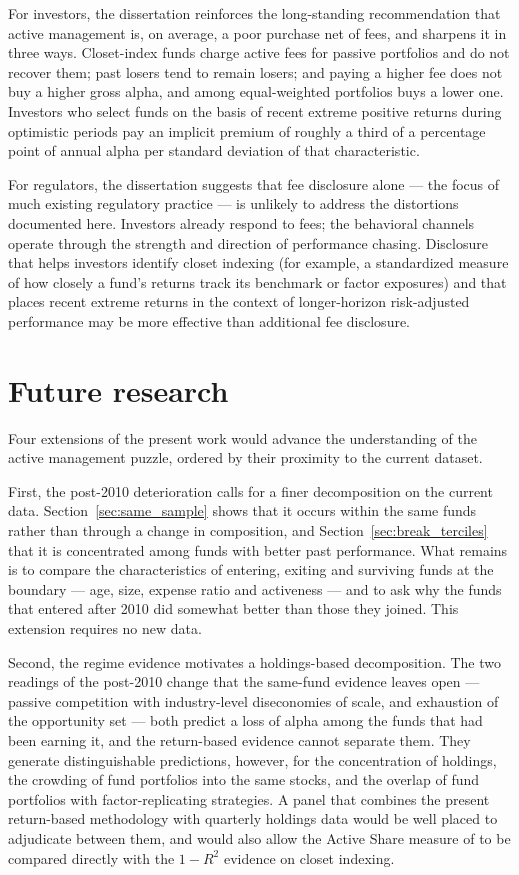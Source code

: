 \documentclass[12pt, oneside]{report}
\begin{document}
For investors, the dissertation reinforces the long-standing
recommendation that active management is, on average, a poor purchase
net of fees, and sharpens it in three ways. Closet-index funds charge
active fees for passive portfolios and do not recover them; past losers
tend to remain losers; and paying a higher fee does not buy a higher
gross alpha, and among equal-weighted portfolios buys a lower one. Investors who select funds on the basis of recent extreme
positive returns during optimistic periods pay an implicit premium of
roughly a third of a percentage point of annual alpha per standard
deviation of that characteristic.

For regulators, the dissertation suggests that fee disclosure alone ---
the focus of much existing regulatory practice --- is unlikely to address
the distortions documented here. Investors already respond to fees; the
behavioral channels operate through the strength and direction of
performance chasing. Disclosure that helps investors identify closet
indexing (for example, a standardized measure of how closely a fund's
returns track its benchmark or factor exposures) and that places recent
extreme returns in the context of longer-horizon risk-adjusted
performance may be more effective than additional fee disclosure.

\section{Future research}
\label{sec:future_research}

\noindent Four extensions of the present work would advance the
understanding of the active management puzzle, ordered by their
proximity to the current dataset.

First, the post-2010 deterioration calls for a finer decomposition on the
current data. Section~\ref{sec:same_sample} shows that it occurs within
the same funds rather than through a change in composition, and
Section~\ref{sec:break_terciles} that it is concentrated among funds
with better past performance. What remains is to compare the
characteristics of entering, exiting and surviving funds at the
boundary --- age, size, expense ratio and activeness --- and to ask why
the funds that entered after 2010 did somewhat better than those they
joined. This extension requires no new data.

Second, the regime evidence motivates a holdings-based decomposition. The
two readings of the post-2010 change that the same-fund evidence leaves
open --- passive competition with industry-level diseconomies of scale,
and exhaustion of the opportunity set --- both predict a loss of alpha
among the funds that had been earning it, and the return-based evidence
cannot separate them. They generate distinguishable predictions,
however, for the concentration of holdings, the crowding of fund
portfolios into the same stocks, and the overlap of fund portfolios
with factor-replicating strategies. A panel that combines
the present return-based methodology with quarterly holdings data would
be well placed to adjudicate between them, and would also allow the
Active Share measure of \textcite{CremersPetajisto2009} to be compared
directly with the $1-R^2$ evidence on closet indexing.
\end{document}
